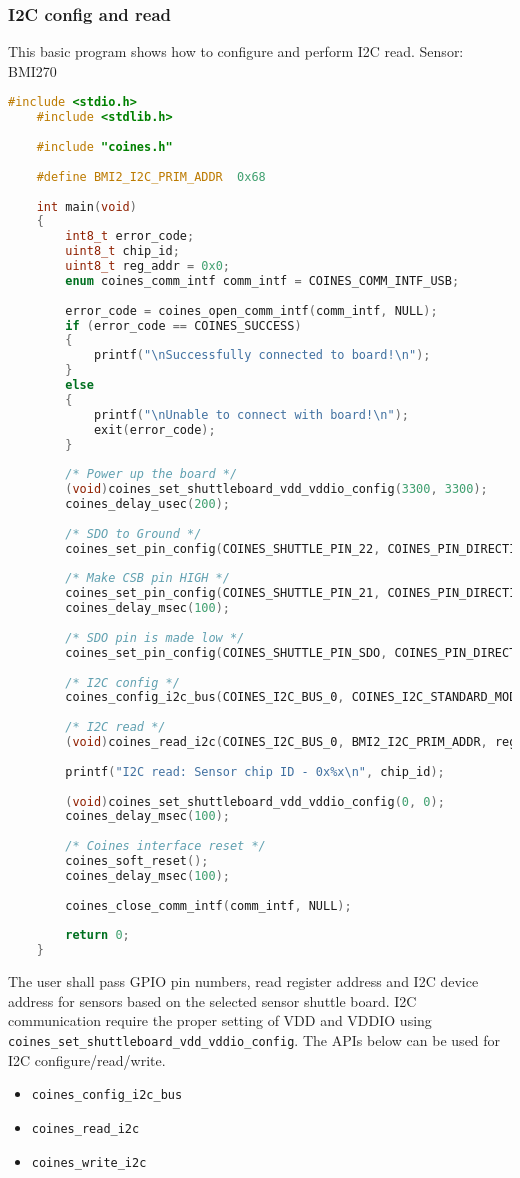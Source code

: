 \documentclass{article}
\begin{document}
\subsubsection{I2C config and read}
This basic program shows how to configure and perform I2C read.
\newline Sensor: BMI270
\begin{lstlisting}[language=c]
	#include <stdio.h>
	#include <stdlib.h>
	
	#include "coines.h"
	
	#define BMI2_I2C_PRIM_ADDR  0x68
	
	int main(void)
	{
		int8_t error_code;
		uint8_t chip_id;
		uint8_t reg_addr = 0x0;
		enum coines_comm_intf comm_intf = COINES_COMM_INTF_USB;
	
		error_code = coines_open_comm_intf(comm_intf, NULL);
		if (error_code == COINES_SUCCESS)
		{
			printf("\nSuccessfully connected to board!\n");
		}
		else
		{
			printf("\nUnable to connect with board!\n");
			exit(error_code);
		}
	
		/* Power up the board */
		(void)coines_set_shuttleboard_vdd_vddio_config(3300, 3300);
		coines_delay_usec(200);
	
		/* SDO to Ground */
		coines_set_pin_config(COINES_SHUTTLE_PIN_22, COINES_PIN_DIRECTION_OUT, COINES_PIN_VALUE_LOW);
	
		/* Make CSB pin HIGH */
		coines_set_pin_config(COINES_SHUTTLE_PIN_21, COINES_PIN_DIRECTION_OUT, COINES_PIN_VALUE_HIGH);
		coines_delay_msec(100);
	
		/* SDO pin is made low */
		coines_set_pin_config(COINES_SHUTTLE_PIN_SDO, COINES_PIN_DIRECTION_OUT, COINES_PIN_VALUE_LOW);
	
		/* I2C config */
		coines_config_i2c_bus(COINES_I2C_BUS_0, COINES_I2C_STANDARD_MODE);
	
		/* I2C read */
		(void)coines_read_i2c(COINES_I2C_BUS_0, BMI2_I2C_PRIM_ADDR, reg_addr, &chip_id, 1);
	
		printf("I2C read: Sensor chip ID - 0x%x\n", chip_id);
	
		(void)coines_set_shuttleboard_vdd_vddio_config(0, 0);
		coines_delay_msec(100);
	
		/* Coines interface reset */
		coines_soft_reset();
		coines_delay_msec(100);
	
		coines_close_comm_intf(comm_intf, NULL);
	
		return 0;
	}
\end{lstlisting}
The user shall pass GPIO pin numbers, read register address and I2C device address for sensors based on the selected sensor shuttle board. I2C communication require the proper setting of VDD and VDDIO using \texttt{coines\_set\_shuttleboard\_vdd\_vddio\_config}.
The APIs below can be used for I2C configure/read/write.
\begin{itemize}
	\item \texttt{coines\_config\_i2c\_bus}
	\item \texttt{coines\_read\_i2c}
	\item \texttt{coines\_write\_i2c}
\end{itemize}
\end{document}
